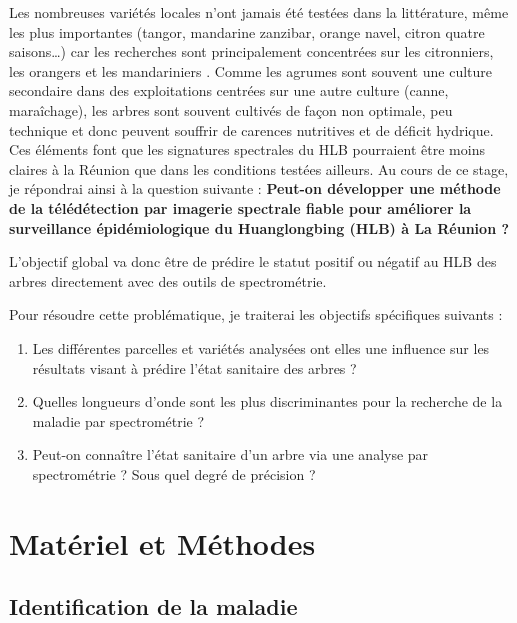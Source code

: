 \documentclass[
  11pt,
  french,
  a4paper,
  extrafontsizes,onecolumn,openright
  ]{memoir}
\providecommand{\tightlist}{%
  \setlength{\itemsep}{0pt}\setlength{\parskip}{0pt}}
\begin{document}
Les nombreuses variétés locales n'ont jamais été testées dans la littérature, même les plus importantes (tangor, mandarine zanzibar, orange navel, citron quatre saisons\ldots) car les recherches sont principalement concentrées sur les citronniers, les orangers et les mandariniers \autocite{sankaran_visible-near_2011} \autocite{deng_detection_2020}. Comme les agrumes sont souvent une culture secondaire dans des exploitations centrées sur une autre culture (canne, maraîchage), les arbres sont souvent cultivés de façon non optimale, peu technique et donc peuvent souffrir de carences nutritives et de déficit hydrique. Ces éléments font que les signatures spectrales du HLB pourraient être moins claires à la Réunion que dans les conditions testées ailleurs. Au cours de ce stage, je répondrai ainsi à la question suivante : \textbf{Peut-on développer une méthode de la télédétection par imagerie spectrale fiable pour améliorer la surveillance épidémiologique du Huanglongbing (HLB) à La Réunion ?}

L'objectif global va donc être de prédire le statut positif ou négatif au HLB des arbres directement avec des outils de spectrométrie.

Pour résoudre cette problématique, je traiterai les objectifs spécifiques suivants :

\begin{enumerate}
\def\labelenumi{\arabic{enumi})}
\tightlist
\item
  Les différentes parcelles et variétés analysées ont elles une influence sur les résultats visant à prédire l'état sanitaire des arbres ?
\item
  Quelles longueurs d'onde sont les plus discriminantes pour la recherche de la maladie par spectrométrie ?
\item
  Peut-on connaître l'état sanitaire d'un arbre via une analyse par spectrométrie ? Sous quel degré de précision ?
\end{enumerate}

\hypertarget{matuxe9riel-et-muxe9thodes}{%
\chapter{Matériel et Méthodes}\label{matuxe9riel-et-muxe9thodes}}

\hypertarget{identification-de-la-maladie}{%
\section{Identification de la maladie}\label{identification-de-la-maladie}}
\end{document}
